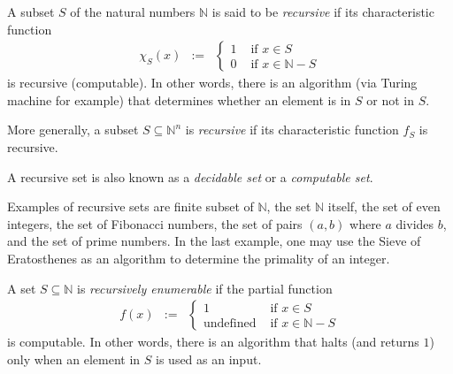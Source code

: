 \documentclass[12pt]{article}
\begin{document}

A subset $S$ of the natural numbers $\mathbb{N}$ is said to be \emph{recursive} if its characteristic function  
\begin{eqnarray*}
\chi_S(x) &:=& \left\{
\begin{array}{ll}
1 & \mbox{ if } x\in S \\
0 & \mbox{ if } x\in \mathbb{N}-S
\end{array}\right.
\end{eqnarray*}
is recursive (computable).  In other words, there is an algorithm (via Turing machine for example) that determines whether an element is in $S$ or not in $S$.

More generally, a subset $S\subseteq \mathbb{N}^n$ is \emph{recursive} if its characteristic function $f_S$ is recursive.

A recursive set is also known as a \emph{decidable set} or a \emph{computable set}.

Examples of recursive sets are finite subset of $\mathbb{N}$, the set $\mathbb{N}$ itself, the set of even integers, the set of Fibonacci numbers, the set of pairs $(a,b)$ where $a$ divides $b$, and the set of prime numbers.  In the last example, one may use the Sieve of Eratosthenes as an algorithm to determine the primality of an integer.

A set $S\subseteq \mathbb{N}$ is \emph{recursively enumerable} if the partial function 
\begin{eqnarray*}
f(x) &:=& \left\{
\begin{array}{ll}
1 & \mbox{ if } x\in S \\
\mbox{undefined} & \mbox{ if } x\in \mathbb{N}-S
\end{array}\right.
\end{eqnarray*}
is computable.  In other words, there is an algorithm that halts (and returns $1$) only when an element in $S$ is used as an input.
\end{document}
